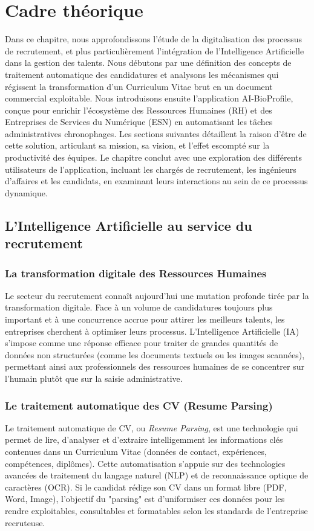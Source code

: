 \chapter{Cadre théorique}

Dans ce chapitre, nous approfondissons l'étude de la digitalisation des processus de recrutement, et plus particulièrement l'intégration de l'Intelligence Artificielle dans la gestion des talents. Nous débutons par une définition des concepts de traitement automatique des candidatures et analysons les mécanismes qui régissent la transformation d'un Curriculum Vitae brut en un document commercial exploitable. Nous introduisons ensuite l'application AI-BioProfile, conçue pour enrichir l'écosystème des Ressources Humaines (RH) et des Entreprises de Services du Numérique (ESN) en automatisant les tâches administratives chronophages. Les sections suivantes détaillent la raison d'être de cette solution, articulant sa mission, sa vision, et l'effet escompté sur la productivité des équipes. Le chapitre conclut avec une exploration des différents utilisateurs de l'application, incluant les chargés de recrutement, les ingénieurs d'affaires et les candidats, en examinant leurs interactions au sein de ce processus dynamique.

\section{L'Intelligence Artificielle au service du recrutement}

\subsection{La transformation digitale des Ressources Humaines}
Le secteur du recrutement connaît aujourd'hui une mutation profonde tirée par la transformation digitale. Face à un volume de candidatures toujours plus important et à une concurrence accrue pour attirer les meilleurs talents, les entreprises cherchent à optimiser leurs processus. L'Intelligence Artificielle (IA) s'impose comme une réponse efficace pour traiter de grandes quantités de données non structurées (comme les documents textuels ou les images scannées), permettant ainsi aux professionnels des ressources humaines de se concentrer sur l'humain plutôt que sur la saisie administrative.

\subsection{Le traitement automatique des CV (Resume Parsing)}
Le traitement automatique de CV, ou \textit{Resume Parsing}, est une technologie qui permet de lire, d'analyser et d'extraire intelligemment les informations clés contenues dans un Curriculum Vitae (données de contact, expériences, compétences, diplômes). Cette automatisation s'appuie sur des technologies avancées de traitement du langage naturel (NLP) et de reconnaissance optique de caractères (OCR). Si le candidat rédige son CV dans un format libre (PDF, Word, Image), l'objectif du "parsing" est d'uniformiser ces données pour les rendre exploitables, consultables et formatables selon les standards de l'entreprise recruteuse.


